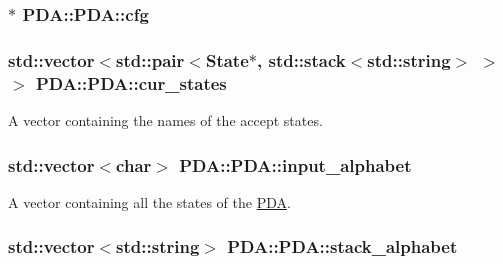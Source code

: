 \hypertarget{classPDA_1_1PDA_aef026ff20ec36b368db8cf05dc7d6ef7}{
\subsubsection[{cfg}]{$\ast$ P\-D\-A\-::\-P\-D\-A\-::cfg\hspace{0.3cm}{\ttfamily [private]}}}\label{classPDA_1_1PDA_aef026ff20ec36b368db8cf05dc7d6ef7}
\hypertarget{classPDA_1_1PDA_a71d7a97ddb658ed2c07e30001ff6ba1b}{
\subsubsection[{cur\-\_\-states}]{\setlength{\rightskip}{0pt plus 5cm}std\-::vector$<$std\-::pair$<${\bf State}$\ast$, std\-::stack$<$std\-::string$>$ $>$ $>$ P\-D\-A\-::\-P\-D\-A\-::cur\-\_\-states\hspace{0.3cm}{\ttfamily [private]}}}\label{classPDA_1_1PDA_a71d7a97ddb658ed2c07e30001ff6ba1b}


A vector containing the names of the accept states. 

\hypertarget{classPDA_1_1PDA_a54db260eece0bfe0d5aad0ef13f18a02}{
\subsubsection[{input\-\_\-alphabet}]{\setlength{\rightskip}{0pt plus 5cm}std\-::vector$<$char$>$ P\-D\-A\-::\-P\-D\-A\-::input\-\_\-alphabet\hspace{0.3cm}{\ttfamily [private]}}}\label{classPDA_1_1PDA_a54db260eece0bfe0d5aad0ef13f18a02}


A vector containing all the states of the \hyperlink{classPDA_1_1PDA}{P\-D\-A}. 

\hypertarget{classPDA_1_1PDA_a90a4f96e28003d5bfa4d67b4c7a191b5}{
\subsubsection[{stack\-\_\-alphabet}]{\setlength{\rightskip}{0pt plus 5cm}std\-::vector$<$std\-::string$>$ P\-D\-A\-::\-P\-D\-A\-::stack\-\_\-alphabet\hspace{0.3cm}{\ttfamily [private]}}}\label{classPDA_1_1PDA_a90a4f96e28003d5bfa4d67b4c7a191b5}


